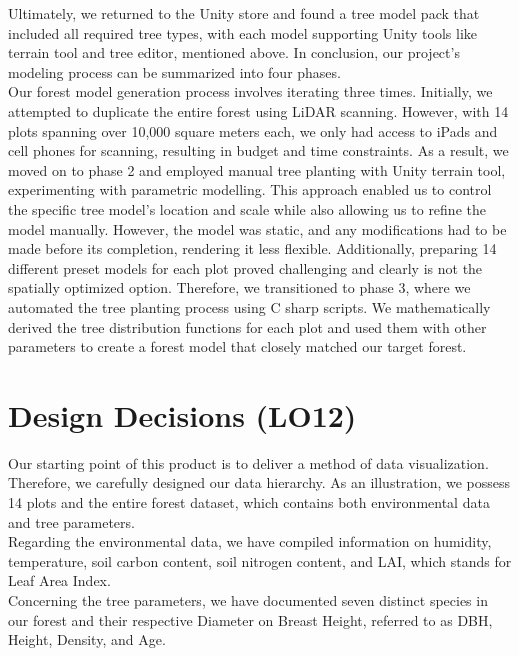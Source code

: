 \documentclass{article}
\begin{document}
\noindent Ultimately, we returned to the Unity store and found a tree model pack that included all required tree types, with each model supporting Unity tools like terrain tool and tree editor, mentioned above. In conclusion, our project's modeling process can be summarized into four phases.\\

\noindent Our forest model generation process involves iterating three times. Initially, we attempted to duplicate the entire forest using LiDAR scanning. However, with 14 plots spanning over 10,000 square meters each, we only had access to iPads and cell phones for scanning, resulting in budget and time constraints. As a result, we moved on to phase 2 and employed manual tree planting with Unity terrain tool, experimenting with parametric modelling. This approach enabled us to control the specific tree model's location and scale while also allowing us to refine the model manually. However, the model was static, and any modifications had to be made before its completion, rendering it less flexible. Additionally, preparing 14 different preset models for each plot proved challenging and clearly is not the spatially optimized option. Therefore, we transitioned to phase 3, where we automated the tree planting process using C sharp scripts. We mathematically derived the tree distribution functions for each plot and used them with other parameters to create a forest model that closely matched our target forest.

\section{Design Decisions (LO12)}


\noindent Our starting point of this product is to deliver a method of data visualization. Therefore, we carefully designed our data hierarchy. As an illustration, we possess 14 plots and the entire forest dataset, which contains both environmental data and tree parameters.\\

\noindent Regarding the environmental data, we have compiled information on humidity, temperature, soil carbon content, soil nitrogen content, and LAI, which stands for Leaf Area Index.\\

\noindent Concerning the tree parameters, we have documented seven distinct species in our forest and their respective Diameter on Breast Height, referred to as DBH, Height, Density, and Age.\\
\end{document}
